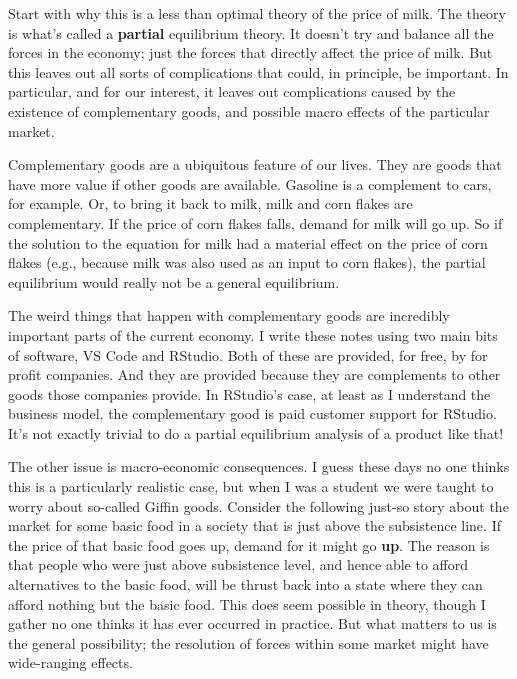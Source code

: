 \documentclass[
  11pt,
  letterpaper,
  DIV=11,
  numbers=noendperiod,
  oneside]{scrartcl}
\begin{document}
Start with why this is a less than optimal theory of the price of milk.
The theory is what's called a \textbf{partial} equilibrium theory. It
doesn't try and balance all the forces in the economy; just the forces
that directly affect the price of milk. But this leaves out all sorts of
complications that could, in principle, be important. In particular, and for our interest, it leaves
out complications caused by the existence of complementary goods, and
possible macro effects of the particular market.

Complementary goods are a ubiquitous feature of our lives. They are
goods that have more value if other goods are available. Gasoline is a
complement to cars, for example. Or, to bring it back to milk, milk and
corn flakes are complementary. If the price of corn flakes falls, demand
for milk will go up. So if the solution to the equation for milk had a
material effect on the price of corn flakes (e.g., because milk was also
used as an input to corn flakes), the partial equilibrium would really
not be a general equilibrium.

The weird things that happen with complementary goods are incredibly
important parts of the current economy. I write these notes using two
main bits of software, VS Code and RStudio. Both of these are provided,
for free, by for profit companies. And they are provided because they
are complements to other goods those companies provide. In RStudio's
case, at least as I understand the business model, the complementary
good is paid customer support for RStudio. It's not exactly trivial to
do a partial equilibrium analysis of a product like that!

The other issue is macro-economic consequences. I guess these days no
one thinks this is a particularly realistic case, but when I was a
student we were taught to worry about so-called Giffin goods. Consider
the following just-so story about the market for some basic food in a
society that is just above the subsistence line. If the price of that
basic food goes up, demand for it might go \textbf{up}. The reason is
that people who were just above subsistence level, and hence able to
afford alternatives to the basic food, will be thrust back into a state
where they can afford nothing but the basic food. This does seem
possible in theory, though I gather no one thinks it has ever occurred
in practice. But what matters to us is the general possibility; the
resolution of forces within some market might have wide-ranging effects.
\end{document}
